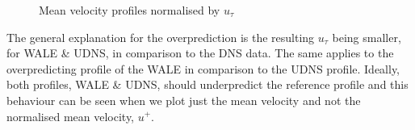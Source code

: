 %
\begin{figure}[h!]
\begin{minipage}[b]{0.5\textwidth}
\end{minipage}
%
\begin{minipage}[b]{0.5\textwidth}
\end{minipage}
\caption{Mean velocity profiles normalised by $u_\tau$}
\label{mean profiles udns vs wale wall coords}
\end{figure} 
%
The general explanation for the overprediction is the resulting $u_\tau$ being smaller, for WALE \& UDNS,  in comparison to the DNS data. The same applies to the overpredicting profile of the WALE in comparison to the UDNS profile. Ideally, both profiles, WALE \& UDNS, should underpredict the reference profile and this behaviour can be seen when we plot just the mean velocity and not the normalised mean velocity, $u^+$. 

